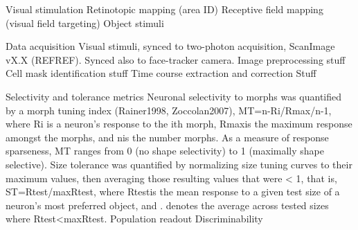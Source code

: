 
Visual stimulation
Retinotopic mapping (area ID)
Receptive field mapping (visual field targeting)
Object stimuli

Data acquisition
Visual stimuli, synced to two-photon acquisition, ScanImage vX.X (REFREF). 
Synced also to face-tracker camera.
Image preprocessing
stuff
Cell mask identification
stuff
Time course extraction and correction
Stuff

Selectivity and tolerance metrics
Neuronal selectivity to morphs was quantified by a morph tuning index (Rainer1998, Zoccolan2007), MT=n-Ri/Rmax/n-1, where Ri is a neuron’s response to the ith morph, Rmaxis the maximum response amongst the morphs, and nis the number morphs. As a measure of response sparseness, MT ranges from 0 (no shape selectivity) to 1 (maximally shape selective). Size tolerance was quantified by normalizing size tuning curves to their maximum values, then averaging those resulting values that were < 1, that is, ST=Rtest/maxRtest, where Rtestis the mean response to a given test size of a neuron’s most preferred object, and . denotes the average across tested sizes where Rtest<maxRtest. 
Population readout
Discriminability
